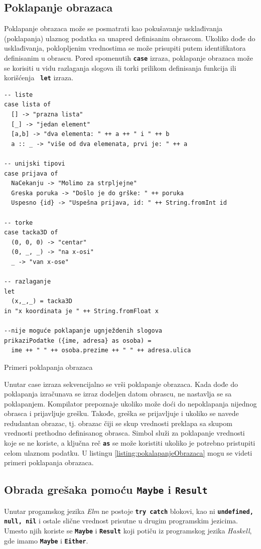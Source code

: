 \documentclass[12pt,oneside]{memoir}
\begin{document}
\subsection{Poklapanje obrazaca}
Poklapanje obrazaca može se posmatrati kao pokušavanje usklađivanja (poklapanja) ulaznog
podatka sa unapred definisanim obrascom. Ukoliko dođe do usklađivanja, poklopljenim
vrednostima se može prisupiti putem identifikatora definisanim u obrascu. Pored spomenutih
\texttt{\textbf{case}} izraza, poklapanje obrazaca može se korisiti u vidu 
razlaganja slogova ili torki prilikom definisanja funkcija ili korišćenja \texttt{\textbf{
let}} izraza.
\begin{listing}[h]
\begin{verbatim}
-- liste 
case lista of
  [] -> "prazna lista"
  [_] -> "jedan element"
  [a,b] -> "dva elementa: " ++ a ++ " i " ++ b
  a :: _ -> "više od dva elemenata, prvi je: " ++ a

-- unijski tipovi
case prijava of
  NaCekanju -> "Molimo za strpljejne"
  Greska poruka -> "Došlo je do grške: " ++ poruka
  Uspesno {id} -> "Uspešna prijava, id: " ++ String.fromInt id

-- torke
case tacka3D of
  (0, 0, 0) -> "centar"
  (0, _, _) -> "na x-osi"
  _ -> "van x-ose"

-- razlaganje
let
  (x,_,_) = tacka3D
in "x koordinata je " ++ String.fromFloat x

--nije moguće poklapanje ugnježdenih slogova
prikaziPodatke ({ime, adresa} as osoba) =
  ime ++ " " ++ osoba.prezime ++ " " ++ adresa.ulica
\end{verbatim}
\caption{Primeri poklapanja obrazaca}
\label{listing:pokalapanjeObrazaca}
\end{listing}

Unutar case izraza sekvencijalno se vrši poklapanje obrazaca. Kada dođe do poklapanja
izračunava se izraz dodeljen datom obrascu, ne nastavlja se sa poklapanjem. Kompilator
prepoznaje ukoliko može doći do nepoklapanja nijednog obrasca i prijavljuje grešku.
Takođe, greška se prijavljuje i ukoliko se navede redudantan obrazac, tj. obrazac čiji se
skup vrednosti preklapa sa skupom vrednosti prethodno definisanog obrasca.
Simbol \texttt{\textbf{\textunderscore}} služi za poklapanje vrednosti koje se ne koriste,
a ključna reč \texttt{\textbf{as}} se može koristiti ukoliko je potrebno pristupiti celom
ulaznom podatku. U listingu \ref{listing:pokalapanjeObrazaca} mogu se videti primeri
poklapanja obrazaca.

\subsection{Obrada grešaka pomoću \texttt{\textbf{Maybe}} i \texttt{\textbf{Result}}}
Unutar progamskog jezika \emph{Elm} ne postoje \texttt{\textbf{try catch}} blokovi, kao ni \texttt{\textbf{undefined, null, nil}}
i ostale slične vrednost prisutne u drugim programskim jezicima.
Umesto njih koriste se \texttt{\textbf{Maybe}} i \texttt{\textbf{Result}} koji potiču iz programskog jezika \emph{Haskell},
gde imamo \texttt{\textbf{Maybe}} i \texttt{\textbf{Either}}.
\end{document}
